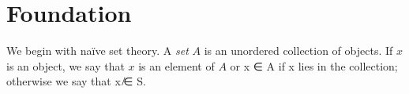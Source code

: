 
\chapter{Foundation}

We begin with na\"ive set theory. A \emph{set} $A$ is an unordered collection of objects. If $x$ is an object, we say that $x$ is an element of $A$ or x ∈ A if x lies in the collection; otherwise we say that x ̸∈ S. 


